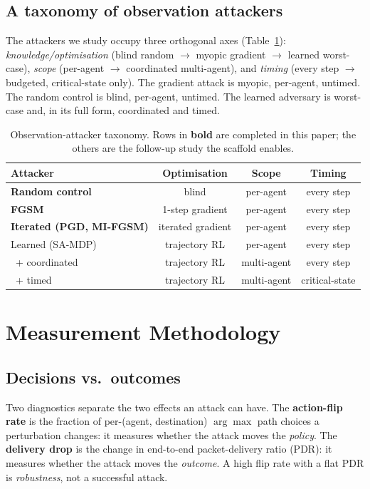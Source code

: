 \documentclass[10pt,journal,comsoc]{IEEEtran}
\begin{document}
\subsection{A taxonomy of observation attackers}
The attackers we study occupy three orthogonal axes (Table~\ref{tab:taxonomy}):
\emph{knowledge/optimisation} (blind random $\rightarrow$ myopic gradient $\rightarrow$
learned worst-case), \emph{scope} (per-agent $\rightarrow$ coordinated multi-agent),
and \emph{timing} (every step $\rightarrow$ budgeted, critical-state only). The gradient
attack is myopic, per-agent, untimed. The random control is blind, per-agent, untimed. The
learned adversary is worst-case and, in its full form, coordinated and timed.

\begin{table}[!t]
  \centering
  \caption{Observation-attacker taxonomy. Rows in \textbf{bold} are completed in this
  paper; the others are the follow-up study the scaffold enables.}
  \label{tab:taxonomy}
  \small
  \begin{tabular}{lccc}
    \toprule
    Attacker & Optimisation & Scope & Timing \\
    \midrule
    \textbf{Random control} & blind & per-agent & every step \\
    \textbf{FGSM} & 1-step gradient & per-agent & every step \\
    \textbf{Iterated (PGD, MI-FGSM)} & iterated gradient & per-agent & every step \\
    Learned (SA-MDP) & trajectory RL & per-agent & every step \\
    ~+ coordinated & trajectory RL & multi-agent & every step \\
    ~+ timed & trajectory RL & multi-agent & critical-state \\
    \bottomrule
  \end{tabular}
\end{table}

\section{Measurement Methodology}
\label{sec:method}
\subsection{Decisions vs.\ outcomes}
Two diagnostics separate the two effects an attack can have. The \textbf{action-flip
rate} is the fraction of per-(agent, destination) $\arg\max$ path choices a
perturbation changes: it measures whether the attack moves the \emph{policy}. The
\textbf{delivery drop} is the change in end-to-end packet-delivery ratio (PDR): it
measures whether the attack moves the \emph{outcome}. A high flip rate with a flat PDR
is \emph{robustness}, not a successful attack.
\end{document}
